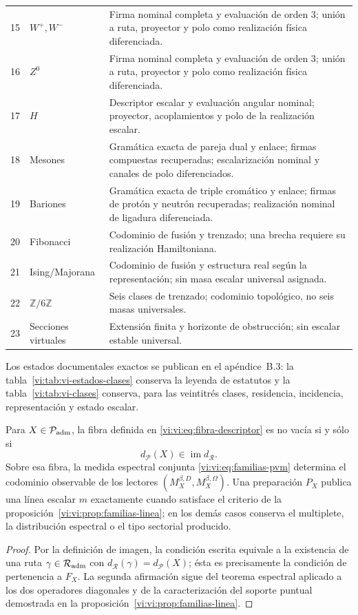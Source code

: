 \begin{longtable}{@{}p{.11\linewidth}p{.20\linewidth}p{.62\linewidth}@{}}
 15&\(W^+,W^-\)&Firma nominal completa y evaluación de orden \(3\); unión a ruta, proyector y polo como realización física diferenciada.\\
 16&\(Z^0\)&Firma nominal completa y evaluación de orden \(3\); unión a ruta, proyector y polo como realización física diferenciada.\\
 17&\(H\)&Descriptor escalar y evaluación angular nominal; proyector, acoplamientos y polo de la realización escalar.\\
 18&Mesones&Gramática exacta de pareja dual y enlace; firmas compuestas recuperadas; escalarización nominal y canales de polo diferenciados.\\
 19&Bariones&Gramática exacta de triple cromático y enlace; firmas de protón y neutrón recuperadas; realización nominal de ligadura diferenciada.\\
 20&Fibonacci&Codominio de fusión y trenzado; una brecha requiere su realización Hamiltoniana.\\
 21&Ising/Majorana&Codominio de fusión y estructura real según la representación; sin masa escalar universal asignada.\\
 22&\(\mathbb Z/6\mathbb Z\)&Seis clases de trenzado; codominio topológico, no seis masas universales.\\
 23&Secciones virtuales&Extensión finita y horizonte de obstrucción; sin escalar estable universal.\\
\end{longtable}

Los estados documentales exactos se publican en el apéndice~B.3: la
tabla~\ref{vi:tab:vi-estados-clases} conserva la leyenda de estatutos y la
tabla~\ref{vi:tab:vi-clases} conserva, para las veintitrés clases, residencia,
incidencia, representación y estado escalar.

\begin{proposition}
\label{vi:vi:prop:producto-fibrado-especie-ruta}
Para \(X\in\mathcal P_{\rm adm}\), la fibra definida en
\eqref{vi:vi:eq:fibra-descriptor} es no vacía si y sólo si
\[
 d_{\mathcal P}(X)\in\operatorname{im}d_{\mathcal R}.
\]
Sobre esa fibra, la medida espectral conjunta
\eqref{vi:vi:eq:familias-pvm} determina el codominio observable de los lectores
\((M_X^{\beta,D},M_X^{\beta,\Omega})\). Una preparación \(P_X\) publica una
línea escalar \(m\) exactamente cuando satisface el criterio de la
proposición~\ref{vi:vi:prop:familias-linea}; en los demás casos conserva el
multiplete, la distribución espectral o el tipo sectorial producido.
\end{proposition}
\begin{proof}
Por la definición de imagen, la condición escrita equivale a la existencia de
una ruta \(\gamma\in\mathcal R_{\rm adm}\) con
\(d_{\mathcal R}(\gamma)=d_{\mathcal P}(X)\); ésta es precisamente la
condición de pertenencia a \(F_X\). La segunda afirmación sigue del teorema
espectral aplicado a los dos operadores diagonales y de la caracterización
del soporte puntual demostrada en la
proposición~\ref{vi:vi:prop:familias-linea}.
\end{proof}

